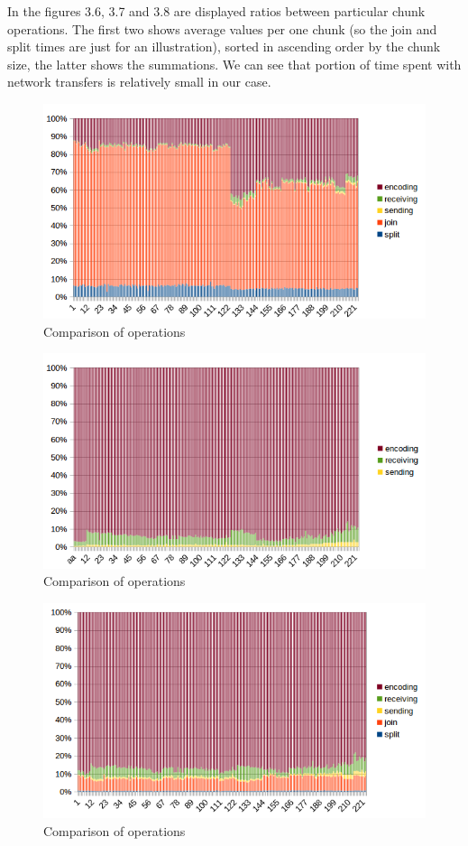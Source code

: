In the figures 3.6, 3.7 and 3.8 are displayed ratios between particular
chunk operations. The first two shows average values per one chunk (so
the join and split times are just for an illustration), sorted in
ascending order by the chunk size, the latter shows the summations. We
can see that portion of time spent with network transfers is relatively
small in our case.

\begin{figure}[h]
\begin{center}
\includegraphics[scale=0.90]{./img/chunks1.png}
\caption{Comparison of operations}
\end{center}
\end{figure}

\begin{figure}[h]
\begin{center}
\includegraphics[scale=0.90]{./img/chunks1_2.png}
\caption{Comparison of operations}
\end{center}
\end{figure}

\begin{figure}[h]
\begin{center}
\includegraphics[scale=0.90]{./img/chunks2.png}
\caption{Comparison of operations}
\end{center}
\end{figure}
